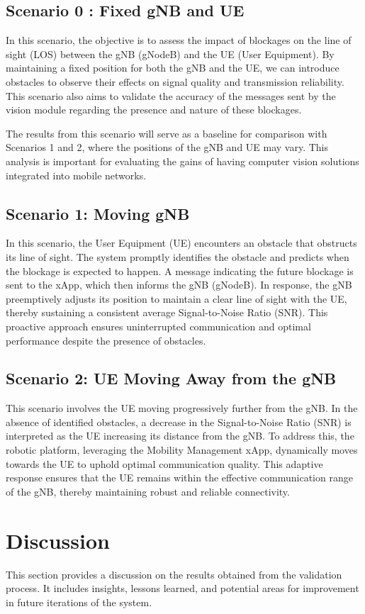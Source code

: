 \subsection{Scenario 0 : Fixed gNB and UE}\label{subsec:scenario-0-:-fixed-gnb-and-ue}

In this scenario, the objective is to assess the impact of blockages on the line of sight (LOS) between the gNB (gNodeB) and the UE (User Equipment).
By maintaining a fixed position for both the gNB and the UE, we can introduce obstacles to observe their effects on signal quality and transmission reliability.
This scenario also aims to validate the accuracy of the messages sent by the vision module regarding the presence and nature of these blockages.

The results from this scenario will serve as a baseline for comparison with Scenarios 1 and 2, where the positions of the gNB and UE may vary.
This analysis is important for evaluating the gains of having computer vision solutions integrated into mobile networks.

\subsection{Scenario 1: Moving gNB}\label{subsec:scenario-1:-moving-gnb}
In this scenario, the User Equipment (UE) encounters an obstacle that obstructs its line of sight. %
The system promptly identifies the obstacle and predicts when the blockage is expected to happen.
A message indicating the future blockage is sent to the xApp, which then informs the gNB (gNodeB). In response, the gNB preemptively adjusts its position to maintain a clear line of sight with the UE, thereby sustaining a consistent average Signal-to-Noise Ratio (SNR). This proactive approach ensures uninterrupted communication and optimal performance despite the presence of obstacles.

\subsection{Scenario 2: UE Moving Away from the gNB}\label{subsec:scenario-2:-ue-moving-away-from-the-gnb}

This scenario involves the UE moving progressively further from the gNB. In the absence of identified obstacles, a decrease in the Signal-to-Noise Ratio (SNR) is interpreted as the UE increasing its distance from the gNB. To address this, the robotic platform, leveraging the Mobility Management xApp, dynamically moves towards the UE to uphold optimal communication quality.
This adaptive response ensures that the UE remains within the effective communication range of the gNB, thereby maintaining robust and reliable connectivity.


\section{Discussion}\label{sec:discuss}
This section provides a discussion on the results obtained from the validation process.
It includes insights, lessons learned, and potential areas for improvement in future iterations of the system.

